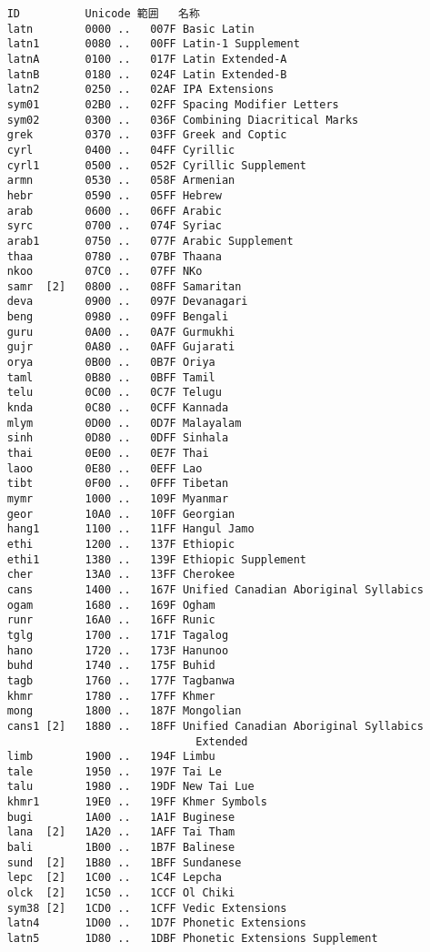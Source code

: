 \documentclass[uplatex,dvipdfmx,a4paper]{jsarticle}
\begin{document}
\begin{verbatim}
    ID          Unicode 範囲   名称
    latn        0000 ..   007F Basic Latin
    latn1       0080 ..   00FF Latin-1 Supplement
    latnA       0100 ..   017F Latin Extended-A
    latnB       0180 ..   024F Latin Extended-B
    latn2       0250 ..   02AF IPA Extensions
    sym01       02B0 ..   02FF Spacing Modifier Letters
    sym02       0300 ..   036F Combining Diacritical Marks
    grek        0370 ..   03FF Greek and Coptic
    cyrl        0400 ..   04FF Cyrillic
    cyrl1       0500 ..   052F Cyrillic Supplement
    armn        0530 ..   058F Armenian
    hebr        0590 ..   05FF Hebrew
    arab        0600 ..   06FF Arabic
    syrc        0700 ..   074F Syriac
    arab1       0750 ..   077F Arabic Supplement
    thaa        0780 ..   07BF Thaana
    nkoo        07C0 ..   07FF NKo
    samr  [2]   0800 ..   08FF Samaritan
    deva        0900 ..   097F Devanagari
    beng        0980 ..   09FF Bengali
    guru        0A00 ..   0A7F Gurmukhi
    gujr        0A80 ..   0AFF Gujarati
    orya        0B00 ..   0B7F Oriya
    taml        0B80 ..   0BFF Tamil
    telu        0C00 ..   0C7F Telugu
    knda        0C80 ..   0CFF Kannada
    mlym        0D00 ..   0D7F Malayalam
    sinh        0D80 ..   0DFF Sinhala
    thai        0E00 ..   0E7F Thai
    laoo        0E80 ..   0EFF Lao
    tibt        0F00 ..   0FFF Tibetan
    mymr        1000 ..   109F Myanmar
    geor        10A0 ..   10FF Georgian
    hang1       1100 ..   11FF Hangul Jamo
    ethi        1200 ..   137F Ethiopic
    ethi1       1380 ..   139F Ethiopic Supplement
    cher        13A0 ..   13FF Cherokee
    cans        1400 ..   167F Unified Canadian Aboriginal Syllabics
    ogam        1680 ..   169F Ogham
    runr        16A0 ..   16FF Runic
    tglg        1700 ..   171F Tagalog
    hano        1720 ..   173F Hanunoo
    buhd        1740 ..   175F Buhid
    tagb        1760 ..   177F Tagbanwa
    khmr        1780 ..   17FF Khmer
    mong        1800 ..   187F Mongolian
    cans1 [2]   1880 ..   18FF Unified Canadian Aboriginal Syllabics
                                 Extended
    limb        1900 ..   194F Limbu
    tale        1950 ..   197F Tai Le
    talu        1980 ..   19DF New Tai Lue
    khmr1       19E0 ..   19FF Khmer Symbols
    bugi        1A00 ..   1A1F Buginese
    lana  [2]   1A20 ..   1AFF Tai Tham
    bali        1B00 ..   1B7F Balinese
    sund  [2]   1B80 ..   1BFF Sundanese
    lepc  [2]   1C00 ..   1C4F Lepcha
    olck  [2]   1C50 ..   1CCF Ol Chiki
    sym38 [2]   1CD0 ..   1CFF Vedic Extensions
    latn4       1D00 ..   1D7F Phonetic Extensions
    latn5       1D80 ..   1DBF Phonetic Extensions Supplement

\end{verbatim}
\end{document}
